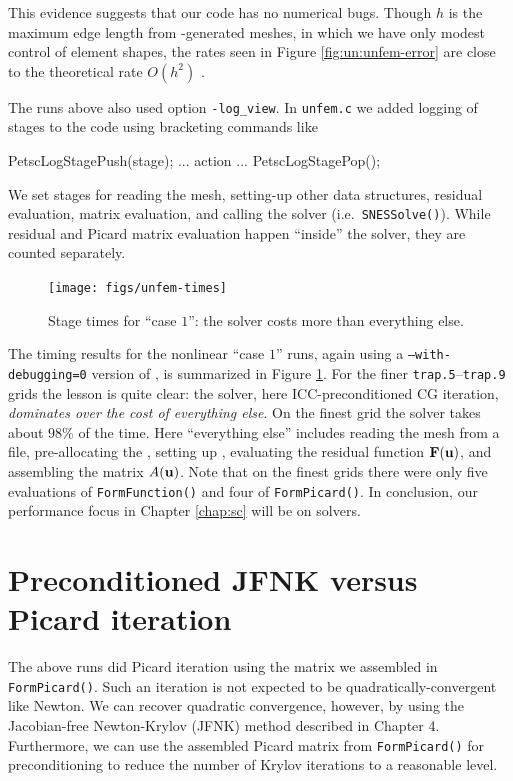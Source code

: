 This evidence suggests that our code has no numerical bugs.  Though $h$ is the maximum edge length from \Triangle-generated meshes, in which we have only modest control of element shapes, the rates seen in Figure \ref{fig:un:unfem-error} are close to the theoretical rate $O(h^2)$ \citep{Braess2007}.

The runs above also used option \texttt{-log\_view}.  In \texttt{unfem.c} we added logging of stages to the code using bracketing \PETSc commands like
\begin{code}
    PetscLogStagePush(stage);
    ... action ...
    PetscLogStagePop();
\end{code}
We set stages for reading the mesh, setting-up other data structures, residual evaluation, matrix evaluation, and calling the solver (i.e.~\texttt{SNESSolve()}).  While residual and Picard matrix evaluation happen ``inside'' the solver, they are counted separately.

\begin{figure}
\texttt{[image: figs/unfem-times]}
\caption{Stage times for ``case $1$'': the solver costs more than everything else.}
\label{fig:un:unfem-times}
\end{figure}

The timing results for the nonlinear ``case $1$'' runs, again using a \texttt{--with-debugging=0} version of \PETSc, is summarized in Figure \ref{fig:un:unfem-times}.  For the finer \texttt{trap.5}--\texttt{trap.9} grids the lesson is quite clear: the solver, here ICC-preconditioned CG iteration, \emph{dominates over the cost of everything else}.  On the finest grid the solver takes about $98\%$ of the time.  Here ``everything else'' includes reading the mesh from a file, pre-allocating the \pMat, setting up \pVecs, evaluating the residual function $\mathbf{F}(\mathbf{u})$, and assembling the matrix $A(\mathbf{u})$.  Note that on the finest grids there were only five evaluations of \texttt{FormFunction()} and four of \texttt{FormPicard()}.  In conclusion, our performance focus in Chapter \ref{chap:sc} will be on solvers.


\section{Preconditioned JFNK versus Picard iteration}

The above runs did Picard iteration using the matrix we assembled in \texttt{FormPicard()}.  Such an iteration is not expected to be quadratically-convergent like Newton.  We can recover quadratic convergence, however, by using the Jacobian-free Newton-Krylov (JFNK) method described in Chapter 4.  Furthermore, we can use the assembled Picard matrix from \texttt{FormPicard()} for preconditioning to reduce the number of Krylov iterations to a reasonable level.

